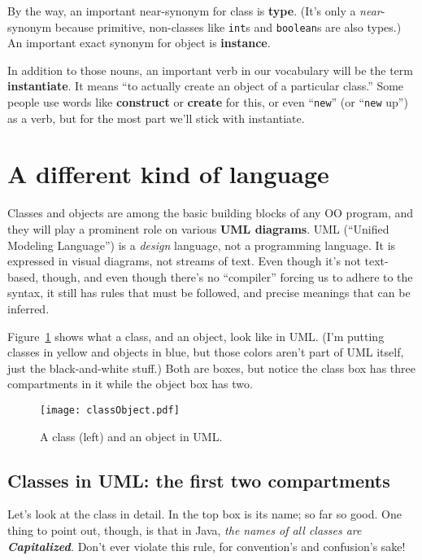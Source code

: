 By the way, an important near-synonym for class is \textbf{type}. (It's only a
\textit{near}-synonym because primitive, non-classes like \texttt{int}s and
\texttt{boolean}s are also types.) An important exact synonym for object is
\textbf{instance}.

In addition to those nouns, an important verb in our vocabulary will be the
term \textbf{instantiate}. It means ``to actually create an object of a
particular class.'' Some people use words like \textbf{construct} or
\textbf{create} for this, or even ``\texttt{new}'' (or ``\texttt{new} up'') as
a verb, but for the most part we'll stick with instantiate.


\section{A different kind of language}
\label{sec:UMLclasses}

Classes and objects are among the basic building blocks of any OO program, and
they will play a prominent role on various \textbf{UML diagrams}. UML
(``Unified Modeling Language'') is a \textit{design} language, not a
programming language. It is expressed in visual diagrams, not streams of text.
Even though it's not text-based, though, and even though there's no
``compiler'' forcing us to adhere to the syntax, it still has rules that must
be followed, and precise meanings that can be inferred.

Figure~\ref{fig:classObject} shows what a class, and an object, look like in
UML. (I'm putting classes in yellow and objects in blue, but those colors
aren't part of UML itself, just the black-and-white stuff.) Both are boxes,
but notice the class box has three compartments in it while the object box has
two.

\begin{figure}[ht]
\centering
\texttt{[image: classObject.pdf]}   %
\caption{A class (left) and an object in UML.}
\label{fig:classObject}
\end{figure}

\subsection{Classes in UML: the first two compartments}

Let's look at the class in detail. In the top box is its name; so far so good.
One thing to point out, though, is that in Java, \textit{the names of all
classes are \textbf{Capitalized}.} Don't ever violate this rule, for
convention's and confusion's sake!

